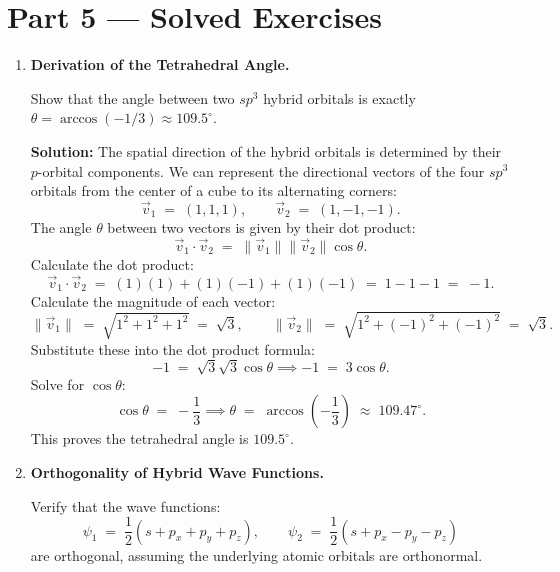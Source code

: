 \documentclass[12pt, a4paper]{book}
\begin{document}
\newpage

\section{Part 5 --- Solved Exercises}

\begin{problembox}
\begin{enumerate}[label=\textbf{E\arabic*.}]
  \item \textbf{Derivation of the Tetrahedral Angle.}
  
        Show that the angle between two $sp^3$ hybrid orbitals is exactly $\theta = \arccos(-1/3) \approx 109.5^\circ$.
        
        \textbf{Solution:}
        The spatial direction of the hybrid orbitals is determined by their $p$-orbital components. We can represent the directional vectors of the four $sp^3$ orbitals from the center of a cube to its alternating corners:
        \[
          \vec{v}_1 \;=\; (1, 1, 1), \qquad \vec{v}_2 \;=\; (1, -1, -1).
        \]
        The angle $\theta$ between two vectors is given by their dot product:
        \[
          \vec{v}_1 \cdot \vec{v}_2 \;=\; \|\vec{v}_1\| \|\vec{v}_2\| \cos\theta.
        \]
        Calculate the dot product:
        \[
          \vec{v}_1 \cdot \vec{v}_2 \;=\; (1)(1) + (1)(-1) + (1)(-1) \;=\; 1 - 1 - 1 \;=\; -1.
        \]
        Calculate the magnitude of each vector:
        \[
          \|\vec{v}_1\| \;=\; \sqrt{1^2 + 1^2 + 1^2} \;=\; \sqrt{3}, \qquad \|\vec{v}_2\| \;=\; \sqrt{1^2 + (-1)^2 + (-1)^2} \;=\; \sqrt{3}.
        \]
        Substitute these into the dot product formula:
        \[
          -1 \;=\; \sqrt{3} \sqrt{3} \cos\theta \implies -1 \;=\; 3 \cos\theta.
        \]
        Solve for $\cos\theta$:
        \[
          \cos\theta \;=\; -\frac{1}{3} \implies \theta \;=\; \arccos\left(-\frac{1}{3}\right) \;\approx\; 109.47^\circ.
        \]
        This proves the tetrahedral angle is $109.5^\circ$.
        
  \item \textbf{Orthogonality of Hybrid Wave Functions.}
  
        Verify that the wave functions:
        \[
          \psi_1 \;=\; \frac{1}{2}\left( s + p_x + p_y + p_z \right), \qquad \psi_2 \;=\; \frac{1}{2}\left( s + p_x - p_y - p_z \right)
        \]
        are orthogonal, assuming the underlying atomic orbitals are orthonormal.
        

\end{enumerate}
\end{problembox}
\end{document}
